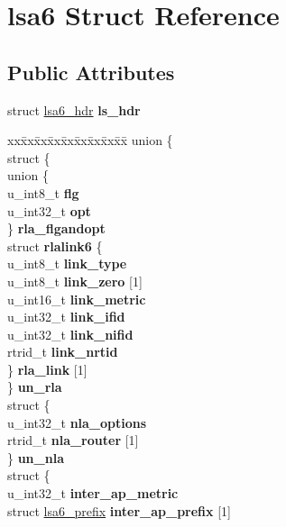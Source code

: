\hypertarget{structlsa6}{
\section{lsa6 Struct Reference}
\label{structlsa6}
}
\subsection*{Public Attributes}
\begin{DoxyCompactItemize}
\item 
\hypertarget{structlsa6_a4c23b9c1c59677486a497dd4d87d3117}{
struct \hyperlink{structlsa6__hdr}{lsa6\_\-hdr} {\bfseries ls\_\-hdr}}
\label{structlsa6_a4c23b9c1c59677486a497dd4d87d3117}

\item 
\hypertarget{structlsa6_a04104e0c5cf86790bbe8570d1289660e}{
\begin{tabbing}
xx\=xx\=xx\=xx\=xx\=xx\=xx\=xx\=xx\=\kill
union \{\\
\>struct \{\\
\>\>union \{\\
\>\>\>u\_int8\_t {\bfseries flg}\\
\>\>\>u\_int32\_t {\bfseries opt}\\
\>\>\} {\bfseries rla\_flgandopt}\\
\>\>struct {\bfseries rlalink6} \{\\
\>\>\>u\_int8\_t {\bfseries link\_type}\\
\>\>\>u\_int8\_t {\bfseries link\_zero} \mbox{[}1\mbox{]}\\
\>\>\>u\_int16\_t {\bfseries link\_metric}\\
\>\>\>u\_int32\_t {\bfseries link\_ifid}\\
\>\>\>u\_int32\_t {\bfseries link\_nifid}\\
\>\>\>rtrid\_t {\bfseries link\_nrtid}\\
\>\>\} {\bfseries rla\_link} \mbox{[}1\mbox{]}\\
\>\} {\bfseries un\_rla}\\
\>struct \{\\
\>\>u\_int32\_t {\bfseries nla\_options}\\
\>\>rtrid\_t {\bfseries nla\_router} \mbox{[}1\mbox{]}\\
\>\} {\bfseries un\_nla}\\
\>struct \{\\
\>\>u\_int32\_t {\bfseries inter\_ap\_metric}\\
\>\>struct \hyperlink{structlsa6__prefix}{lsa6\_prefix} {\bfseries inter\_ap\_prefix} \mbox{[}1\mbox{]}\\

\end{tabbing}}
\end{DoxyCompactItemize}

